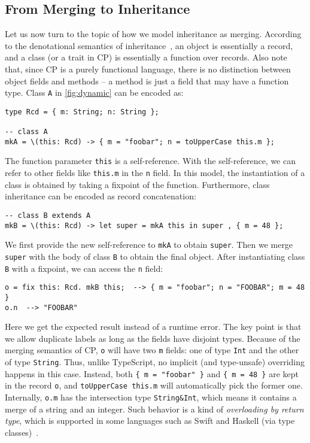 \subsection{From Merging to Inheritance} \label{sec:inheritance}

Let us now turn to the topic of how we model inheritance as merging. According
to the denotational semantics of inheritance~\citep{cook1989denotational}, an
object is essentially a record, and a class (or a trait in CP) is essentially a
function over records. Also note that, since CP is a purely functional language,
there is no distinction between object fields and methods -- a method is just a
field that may have a function type. Class \lstinline{A} in
\autoref{fig:dynamic} can be encoded as:
\begin{lstlisting}
type Rcd = { m: String; n: String };

-- class A
mkA = \(this: Rcd) -> { m = "foobar"; n = toUpperCase this.m };
\end{lstlisting}
The function parameter \lstinline{this} is a self-reference. With the
self-reference, we can refer to other fields like \lstinline{this.m} in the
\lstinline{n} field. In this model, the instantiation of a class is obtained by
taking a fixpoint of the function. Furthermore, class inheritance can be encoded
as record concatenation:
\begin{lstlisting}
-- class B extends A
mkB = \(this: Rcd) -> let super = mkA this in super , { m = 48 };
\end{lstlisting}
We first provide the new self-reference to \lstinline{mkA} to obtain
\lstinline{super}. Then we merge \lstinline{super} with the body of class
\lstinline{B} to obtain the final object. After instantiating class
\lstinline{B} with a fixpoint, we can access the \lstinline{n} field:
\begin{lstlisting}
o = fix this: Rcd. mkB this;  --> { m = "foobar"; n = "FOOBAR"; m = 48 }
o.n  --> "FOOBAR"
\end{lstlisting}
Here we get the expected result instead of a runtime error. The key point is
that we allow duplicate labels as long as the fields have disjoint types.
Because of the merging semantics of CP, \lstinline{o} will have two
\lstinline{m} fields: one of type \lstinline{Int} and the other of type
\lstinline{String}. Thus, unlike TypeScript, no implicit (and type-unsafe)
overriding happens in this case. Instead, both \lstinline|{ m = "foobar" }| and
\lstinline|{ m = 48 }| are kept in the record \lstinline{o}, and
\lstinline{toUpperCase this.m} will automatically pick the former one.
Internally, \lstinline{o.m} has the intersection type \lstinline{String&Int},
which means it contains a merge of a string and an integer. Such behavior is a
kind of \emph{overloading by return type}, which is supported in some languages
such as Swift and Haskell (via type classes)~\citep{marntirosian2020resolution}.

